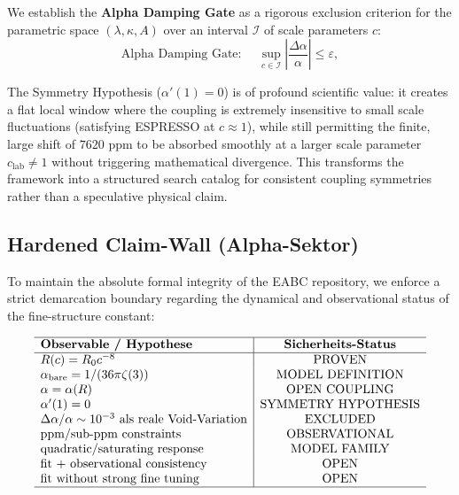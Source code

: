 \documentclass[11pt,a4paper]{article}
\theoremstyle{definition}
\begin{document}
	We establish the \textbf{Alpha Damping Gate} as a rigorous exclusion criterion for the parametric space $(\lambda, \kappa, A)$ over an interval $\mathcal{I}$ of scale parameters $c$:
	\begin{equation}
		\text{Alpha Damping Gate: } \quad \sup_{c \in \mathcal{I}} \left|\frac{\Delta\alpha}{\alpha}\right| \le \varepsilon,
	\end{equation}
	
	The Symmetry Hypothesis ($\alpha'(1)=0$) is of profound scientific value: it creates a flat local window where the coupling is extremely insensitive to small scale fluctuations (satisfying ESPRESSO at $c \approx 1$), while still permitting the finite, large shift of $7620$ ppm to be absorbed smoothly at a larger scale parameter $c_{\text{lab}} \neq 1$ without triggering mathematical divergence. This transforms the framework into a structured search catalog for consistent coupling symmetries rather than a speculative physical claim.
	
	\subsection{Hardened Claim-Wall (Alpha-Sektor)}
	To maintain the absolute formal integrity of the EABC repository, we enforce a strict demarcation boundary regarding the dynamical and observational status of the fine-structure constant:
	
	\begin{equation}
		\begin{array}{l|c}
			\hline
			\textbf{Observable / Hypothese} & \textbf{Sicherheits-Status} \\
			\hline
			R(c) = R_0 c^{-8} & \mathrm{PROVEN} \\
			\alpha_{\rm bare} = 1/(36\pi\zeta(3)) & \mathrm{MODEL\ DEFINITION} \\
			\alpha = \alpha(R) & \mathrm{OPEN\ COUPLING} \\
			\alpha'(1) = 0 & \mathrm{SYMMETRY\ HYPOTHESIS} \\
			\Delta\alpha/\alpha \sim 10^{-3} \text{ als reale Void-Variation} & \mathrm{EXCLUDED} \\
			\text{ppm/sub-ppm constraints} & \mathrm{OBSERVATIONAL} \\
			\text{quadratic/saturating response} & \mathrm{MODEL\ FAMILY} \\
			\text{fit + observational consistency} & \mathrm{OPEN} \\
			\text{fit without strong fine tuning} & \mathrm{OPEN} \\
			\hline
		\end{array}
	\end{equation}
	
\end{document}
